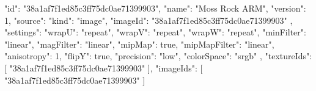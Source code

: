 {
  "id": "38a1af7f1ed85c3ff75dc0ae71399903",
  "name": "Moss Rock ARM",
  "version": 1,
  "source": {
    "kind": "image",
    "imageId": "38a1af7f1ed85c3ff75dc0ae71399903"
  },
  "settings": {
    "wrapU": "repeat",
    "wrapV": "repeat",
    "wrapW": "repeat",
    "minFilter": "linear",
    "magFilter": "linear",
    "mipMap": true,
    "mipMapFilter": "linear",
    "anisotropy": 1,
    "flipY": true,
    "precision": "low",
    "colorSpace": "srgb"
  },
  "textureIds": [
    "38a1af7f1ed85c3ff75dc0ae71399903"
  ],
  "imageIds": [
    "38a1af7f1ed85c3ff75dc0ae71399903"
  ]
}
